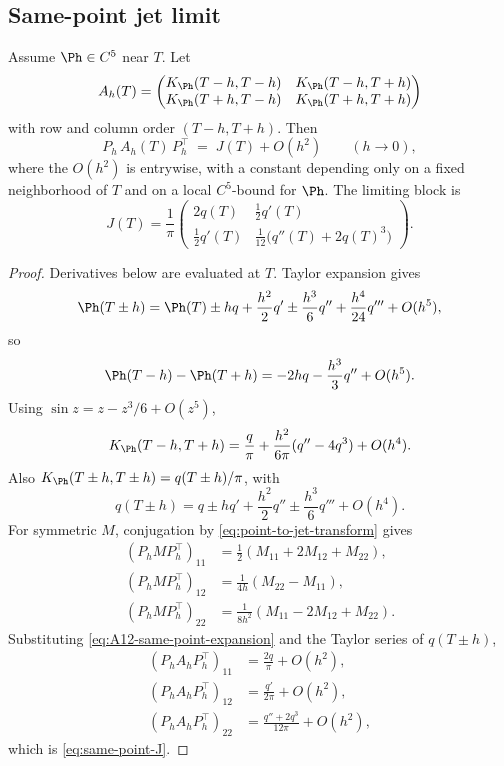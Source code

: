 \subsection{Same-point jet limit}
\label{subsec:same-point-jet-limit}

\begin{lemma}
\label{lem:same-point-jet-limit}
Assume \(\Ph\in C^5\) near \(T\).  Let
\[
A_h(T)=
\begin{pmatrix}
K_\Ph(T-h,T-h) & K_\Ph(T-h,T+h)\\
K_\Ph(T+h,T-h) & K_\Ph(T+h,T+h)
\end{pmatrix}
\]
with row and column order \((T-h, T+h)\).  Then
\[
        P_h\,A_h(T)\,P_h^\top \;=\; J(T) + O(h^2)
        \qquad (h\to 0),
\]
where the \(O(h^2)\) is entrywise, with a constant depending only on a
fixed neighborhood of \(T\) and on a local \(C^5\)-bound for \(\Ph\).  The
limiting block is
\begin{equation}
\label{eq:same-point-J}
J(T)=\frac1\pi
\begin{pmatrix}
2q(T) & \tfrac12 q'(T)\\[1ex]
\tfrac12 q'(T) & \tfrac1{12}\bigl(q''(T)+2q(T)^3\bigr)
\end{pmatrix}.
\end{equation}
\end{lemma}

\begin{proof}
Derivatives below are evaluated at \(T\).  Taylor expansion gives
\[
\Ph(T\pm h) = \Ph(T) \pm hq + \frac{h^2}{2}q'
            \pm \frac{h^3}{6}q'' + \frac{h^4}{24}q'''
            + O(h^5),
\]
so
\[
\Ph(T-h)-\Ph(T+h) = -2hq - \frac{h^3}{3}q'' + O(h^5).
\]
Using \(\sin z = z - z^3/6 + O(z^5)\),
\begin{equation}
\label{eq:A12-same-point-expansion}
K_\Ph(T-h, T+h)
= \frac{q}{\pi} + \frac{h^2}{6\pi}(q'' - 4q^3) + O(h^4).
\end{equation}
Also \(K_\Ph(T\pm h,T\pm h)=q(T\pm h)/\pi\), with
\[
q(T\pm h)=q\pm hq'+\frac{h^2}{2}q''
          \pm\frac{h^3}{6}q'''+O(h^4).
\]
For symmetric \(M\), conjugation by \eqref{eq:point-to-jet-transform}
gives
\begin{align*}
(P_h M P_h^\top)_{11} &= \tfrac12(M_{11}+2M_{12}+M_{22}),\\
(P_h M P_h^\top)_{12} &= \tfrac{1}{4h}(M_{22}-M_{11}),\\
(P_h M P_h^\top)_{22} &= \tfrac{1}{8h^2}(M_{11}-2M_{12}+M_{22}).
\end{align*}
Substituting \eqref{eq:A12-same-point-expansion} and the Taylor series
of \(q(T\pm h)\),
\begin{align*}
(P_h A_h P_h^\top)_{11} &= \frac{2q}{\pi} + O(h^2),\\
(P_h A_h P_h^\top)_{12} &= \frac{q'}{2\pi} + O(h^2),\\
(P_h A_h P_h^\top)_{22} &= \frac{q''+2q^3}{12\pi} + O(h^2),
\end{align*}
which is \eqref{eq:same-point-J}.
\end{proof}

